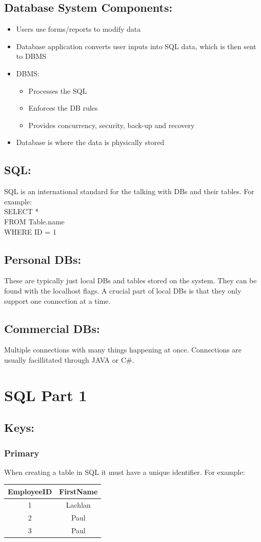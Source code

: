 \documentclass[a5paper]{article}
\begin{document}
	\subsection{Database System Components:}
	\begin{itemize}
		\item Users use forms/reports to modify data
		\item Database application converts user inputs into SQL data, which is then sent to DBMS
		\item DBMS:
		\begin{itemize}
			\item Processes the SQL
			\item Enforces the DB rules
			\item Provides concurrency, security, back-up and recovery
		\end{itemize}
		\item Database is where the data is physically stored
	\end{itemize}
	\subsection{SQL:}
	SQL is an international standard for the talking with DBs and their tables. For example:\\[1\baselineskip]
	SELECT *\\
	FROM Table.name\\
	WHERE ID = 1
	\subsection{Personal DBs:}
	These are typically just local DBs and tables stored on the system. They can be found with the localhost flags. A crucial part of local DBs is that they only support one connection at a time.
	\subsection{Commercial DBs:}
	Multiple connections with many things happening at once. Connections are usually facillitated through JAVA or C\#.

	\section{SQL Part 1}
	\subsection{Keys:}
	\subsubsection{Primary}
	When creating a table in SQL it must have a unique identifier. For example:
	\begin{center}
	\begin{tabular}{ c | c }
		EmployeeID & FirstName\\
		\hline
		1 & Lachlan \\
		2 & Paul \\
		3 & Paul
	\end{tabular}
	\end{center}
\end{document}
